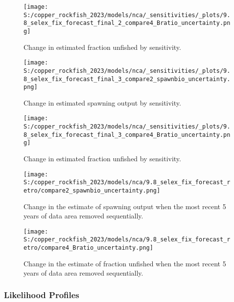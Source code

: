 \documentclass[
  letterpaper,
]{article}
\begin{document}
\begin{figure}
\centering
\texttt{[image: S:/copper\_rockfish\_2023/models/nca/\_sensitivities/\_plots/9.8\_selex\_fix\_forecast\_final\_2\_compare4\_Bratio\_uncertainty.png]}
\caption{Change in estimated fraction unfished by sensitivity.\label{fig:sens-depl-2}}
\end{figure}

\newpage

\begin{figure}
\centering
\texttt{[image: S:/copper\_rockfish\_2023/models/nca/\_sensitivities/\_plots/9.8\_selex\_fix\_forecast\_final\_3\_compare2\_spawnbio\_uncertainty.png]}
\caption{Change in estimated spawning output by sensitivity.\label{fig:sens-ssb-3}}
\end{figure}

\newpage

\begin{figure}
\centering
\texttt{[image: S:/copper\_rockfish\_2023/models/nca/\_sensitivities/\_plots/9.8\_selex\_fix\_forecast\_final\_3\_compare4\_Bratio\_uncertainty.png]}
\caption{Change in estimated fraction unfished by sensitivity.\label{fig:sens-depl-3}}
\end{figure}

\newpage

\begin{figure}
\centering
\texttt{[image: S:/copper\_rockfish\_2023/models/nca/9.8\_selex\_fix\_forecast\_retro/compare2\_spawnbio\_uncertainty.png]}
\caption{Change in the estimate of spawning output when the most recent 5 years of data area removed sequentially.\label{fig:retro-ssb}}
\end{figure}

\pagebreak

\begin{figure}
\centering
\texttt{[image: S:/copper\_rockfish\_2023/models/nca/9.8\_selex\_fix\_forecast\_retro/compare4\_Bratio\_uncertainty.png]}
\caption{Change in the estimate of fraction unfished when the most recent 5 years of data area removed sequentially.\label{fig:retro-depl}}
\end{figure}

\pagebreak

\hypertarget{likelihood-profiles}{%
\subsubsection{Likelihood Profiles}\label{likelihood-profiles}}
\end{document}
